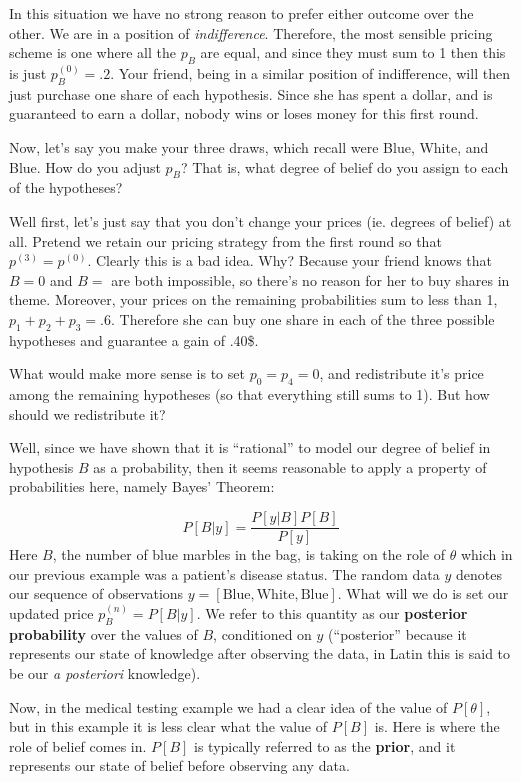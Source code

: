 \documentclass[
]{article}
\begin{document}
In this situation we have no strong reason to prefer either outcome over
the other. We are in a position of \emph{indifference}. Therefore, the
most sensible pricing scheme is one where all the \(p_B\) are equal, and
since they must sum to 1 then this is just \(p_B^{(0)}=.2\). Your
friend, being in a similar position of indifference, will then just
purchase one share of each hypothesis. Since she has spent a dollar, and
is guaranteed to earn a dollar, nobody wins or loses money for this
first round.

Now, let's say you make your three draws, which recall were Blue, White,
and Blue. How do you adjust \(p_B\)? That is, what degree of belief do
you assign to each of the hypotheses?

Well first, let's just say that you don't change your prices (ie.
degrees of belief) at all. Pretend we retain our pricing strategy from
the first round so that \(p^{(3)} = p^{(0)}\). Clearly this is a bad
idea. Why? Because your friend knows that \(B=0\) and \(B=\) are both
impossible, so there's no reason for her to buy shares in theme.
Moreover, your prices on the remaining probabilities sum to less than 1,
\(p_1+p_2+p_3=.6\). Therefore she can buy one share in each of the three
possible hypotheses and guarantee a gain of .40\$.

What would make more sense is to set \(p_0=p_4=0\), and redistribute
it's price among the remaining hypotheses (so that everything still sums
to 1). But how should we redistribute it?

Well, since we have shown that it is ``rational'' to model our degree of
belief in hypothesis \(B\) as a probability, then it seems reasonable to
apply a property of probabilities here, namely Bayes' Theorem:

\[
P[B | y ] = \frac{ P[y|B] P[B] }{P[y]}
\] Here \(B\), the number of blue marbles in the bag, is taking on the
role of \(\theta\) which in our previous example was a patient's disease
status. The random data \(y\) denotes our sequence of observations
\(y=[\text{Blue},\text{White},\text{Blue}]\). What will we do is set our
updated price \(p^{(n)}_B = P[B|y]\). We refer to this quantity as our
\textbf{posterior probability} over the values of \(B\), conditioned on
\(y\) (``posterior'' because it represents our state of knowledge after
observing the data, in Latin this is said to be our \emph{a posteriori}
knowledge).

Now, in the medical testing example we had a clear idea of the value of
\(P[\theta]\), but in this example it is less clear what the value of
\(P[B]\) is. Here is where the role of belief comes in. \(P[B]\) is
typically referred to as the \textbf{prior}, and it represents our state
of belief before observing any data.
\end{document}
